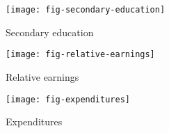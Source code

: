 \begin{frame}
	\begin{figure}[htp]\centering
		\caption{Secondary education}\scalebox{0.35}
		{\texttt{[image: fig-secondary-education]}}
	\end{figure}
\end{frame}
\begin{frame}
	\begin{figure}[htp]\centering
		\caption{Relative earnings}\scalebox{0.35}
		{\texttt{[image: fig-relative-earnings]}}
	\end{figure}
\end{frame}
\begin{frame}
	\begin{figure}[htp]\centering
		\caption{Expenditures}\scalebox{0.35}
		{\texttt{[image: fig-expenditures]}}
	\end{figure}
\end{frame}
